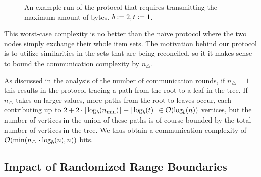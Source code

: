 \begin{figure*}
\begin{scaletikzpicturetowidth}{\textwidth}
\end{scaletikzpicturetowidth}

\caption{An example run of the protocol that requires transmitting the maximum amount of bytes. $b \vcentcolon= 2, t \vcentcolon= 1$.}

\label{fig:worst-bytes}
\end{figure*}

This worst-case complexity is no better than the naïve protocol where the two nodes simply exchange their whole item sets. The motivation behind our protocol is to utilize similarities in the sets that are being reconciled, so it it makes sense to bound the communication complexity by $n_{\triangle}$.

As discussed in the analysis of the number of communication rounds, if $n_{\triangle} = 1$ this results in the protocol tracing a path from the root to a leaf in the tree. If $n_{\triangle}$ takes on larger values, more paths from the root to leaves occur, each contributing up to $2 + 2 \cdot\lceil\log_{b}(n_{\min})\rceil - \lfloor\log_{b}(t)\rfloor \in \mathcal{O}(\log_{b}(n))$ vertices, but the number of vertices in the union of these paths is of course bounded by the total number of vertices in the tree. We thus obtain a communication complexity of $\mathcal{O}(\min(n_{\triangle} \cdot \log_b(n), n))$ bits.

\subsection{Impact of Randomized Range Boundaries}
\label{random-boundaries}

